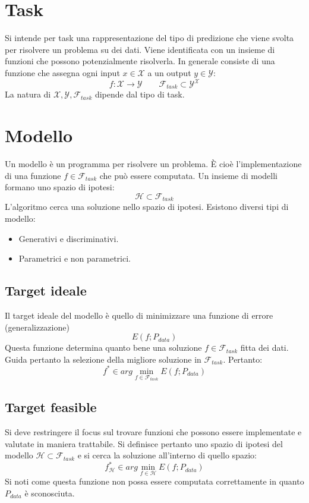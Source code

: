 \section{Task}
Si intende per task una rappresentazione del tipo di predizione che viene svolta per risolvere un problema su dei dati.
Viene identificata con un insieme di funzioni che possono potenzialmente risolverla.
In generale consiste di una funzione che assegna ogni input $x\in\mathcal{X}$ a un output $y\in\mathcal{Y}$:
$$f:\mathcal{X}\rightarrow\mathcal{Y}\qquad\mathcal{F}_{task}\subset\mathcal{Y^X}$$
La natura di $\mathcal{X},\mathcal{Y}, \mathcal{F}_{task}$ dipende dal tipo di task.

\section{Modello}
Un modello \`e un programma per risolvere un problema.
\`E cio\`e l'implementazione di una funzione $f\in\mathcal{F}_{task}$ che pu\`o essere computata.
Un insieme di modelli formano uno spazio di ipotesi:
$$\mathcal{H}\subset\mathcal{F}_{task}$$
L'algoritmo cerca una soluzione nello spazio di ipotesi.
Esistono diversi tipi di modello:
\begin{multicols}{2}
	\begin{itemize}
		\item Generativi e discriminativi.
		\item Parametrici e non parametrici.
	\end{itemize}
\end{multicols}

	\subsection{Target ideale}
	Il target ideale del modello \`e quello di minimizzare una funzione di errore (generalizzazione)
	$$E(f;P_{data})$$
	Questa funzione determina quanto bene una soluzione $f\in\mathcal{F}_{task}$ fitta dei dati.
	Guida pertanto la selezione della migliore soluzione in $\mathcal{F}_{task}$.
	Pertanto:
	$$f^*\in arg\min\limits_{f\in\mathcal{F}_{task}}E(f;P_{data})$$

	\subsection{Target feasible}
	Si deve restringere il focus sul trovare funzioni che possono essere implementate e valutate in maniera trattabile.
	Si definisce pertanto uno spazio di ipotesi del modello $\mathcal{H}\subset\mathcal{F}_{task}$ e si cerca la soluzione all'interno di quello spazio:
	$$f^*_{\mathcal{H}}\in arg\min\limits_{f\in\mathcal{H}} E(f;P_{data})$$
	Si noti come questa funzione non possa essere computata correttamente in quanto $P_{data}$ \`e sconosciuta.

